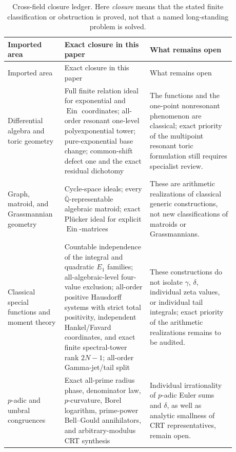 \documentclass[11pt]{article}
\theoremstyle{definition}
\theoremstyle{remark}
\newcommand{\Qbar}{\overline{\mathbb Q}}
\newcommand{\Ein}{\operatorname{Ein}}
\begin{document}
\begingroup
\footnotesize
\renewcommand{\arraystretch}{1.12}
\begin{longtable}{>{\raggedright\arraybackslash}p{0.20\linewidth}
                >{\raggedright\arraybackslash}p{0.34\linewidth}
                >{\raggedright\arraybackslash}p{0.34\linewidth}}
\caption{Cross-field closure ledger.  Here \emph{closure} means that the
stated finite classification or obstruction is proved, not that a named
long-standing problem is solved.}
\label{tab:closure-ledger}\\
\toprule
Imported area & Exact closure in this paper & What remains open \\
\midrule
\endfirsthead
\toprule
Imported area & Exact closure in this paper & What remains open \\
\midrule
\endhead
\bottomrule
\endfoot
Differential algebra and toric geometry & Full finite relation ideal for
exponential and \(\Ein\) coordinates; all-order resonant one-level
polyexponential tower; pure-exponential base change; common-shift defect one
and the exact residual dichotomy & The functions and the one-point
nonresonant phenomenon are classical; exact priority of the multipoint
resonant toric formulation still requires specialist review. \\

Graph, matroid, and Grassmannian geometry & Cycle-space ideals; every
\(\Qbar\)-representable algebraic matroid; exact Pl\"ucker ideal for explicit
\(\Ein\)-matrices & These are arithmetic realizations of classical generic
constructions, not new classifications of matroids or Grassmannians. \\

Classical special functions and moment theory & Countable independence of
the integral and quadratic \(E_1\) families; all-algebraic-level four-value
exclusion; all-order positive Hausdorff systems with strict total positivity,
independent Hankel/Favard coordinates, and exact finite spectral-tower rank
\(2N-1\); all-order Gamma-jet/tail split & These constructions do not isolate
\(\gamma\), \(\delta\), individual zeta values, or individual tail
integrals; exact priority of the arithmetic realizations remains to be
audited. \\

\(p\)-adic and umbral congruences & Exact all-prime radius phase, denominator
law, \(p\)-curvature, Borel logarithm, prime-power Bell--Gould annihilators,
and arbitrary-modulus CRT synthesis & Individual irrationality of \(p\)-adic
Euler sums and \(\delta\), as well as analytic smallness of CRT
representatives, remain open. \\


\end{longtable}
\end{document}
